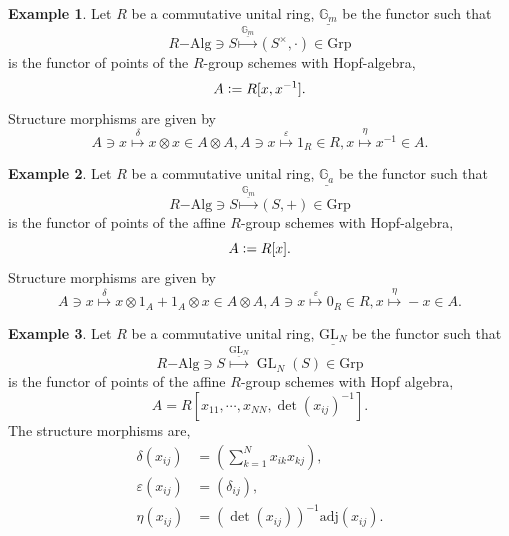 \documentclass[10pt]{article}
\numberwithin{equation}{section}
\theoremstyle{definition}
\newtheorem{example}{Example}[section]
\DeclareMathOperator{\GL}{GL}
\newcommand{\defeq}{\vcentcolon=}
\newcommand{\Grp}[0]{\mathrm{Grp}}
\begin{document}
\begin{example}
    Let $R$ be a commutative unital ring, $\underline{\mathbb{G}_m}$ be the functor such that 
    \begin{equation*}
        R\mathrm{-Alg}\ni S\stackrel{\underline{\mathbb{G}_m}}{\mapsto}(S^\times,\cdot)\in\Grp
    \end{equation*}
    is the functor of points of the $R$-group schemes with Hopf-algebra,
    \begin{equation*}
        A\defeq R[x,x^{-1}].
    \end{equation*}
    Structure morphisms are given by 
    \begin{equation*}
        A\ni x\stackrel{\delta}{\mapsto}x\otimes x\in A\otimes A, A\ni x\stackrel{\varepsilon}{\mapsto} 1_R\in R, x\stackrel{\eta}{\mapsto}x^{-1}\in A.
    \end{equation*}
\end{example}
\begin{example}
    Let $R$ be a commutative unital ring, $\underline{\mathbb{G}_a}$ be the functor such that 
    \begin{equation*}
        R\mathrm{-Alg}\ni S\stackrel{\underline{\mathbb{G}_m}}{\mapsto}(S,+)\in\Grp
    \end{equation*}
    is the functor of points of the affine $R$-group schemes with Hopf-algebra,
    \begin{equation*}
        A\defeq R[x].
    \end{equation*}
    Structure morphisms are given by 
    \begin{equation*}
        A\ni x\stackrel{\delta}{\mapsto}x\otimes 1_A+1_A\otimes x\in A\otimes A, A\ni x\stackrel{\varepsilon}{\mapsto} 0_R\in R, x\stackrel{\eta}{\mapsto}-x\in A.
    \end{equation*}
\end{example}

\begin{example}
    Let $R$ be a commutative unital ring, $\underline{\mathrm{GL}_N}$ be the functor such that 
    \begin{equation*}
        R\mathrm{-Alg}\ni S\stackrel{\underline{\mathrm{GL}_N}}{\mapsto}\GL_N(S)\in\Grp
    \end{equation*}
    is the functor of points of the affine $R$-group schemes with Hopf algebra,
    \begin{equation*}
        A = R[x_{11},\cdots,x_{NN},\det(x_{ij})^{-1}].
    \end{equation*}
    The structure morphisms are,
    \begin{align*}
        \delta(x_{ij}) &= \left(\sum_{k=1}^N x_{ik}x_{kj}\right),\\
        \varepsilon(x_{ij}) &= (\delta_{ij}),\\
        \eta(x_{ij}) &= (\det(x_{ij}))^{-1}\mathrm{adj}(x_{ij}).
    \end{align*}
\end{example}
\end{document}
